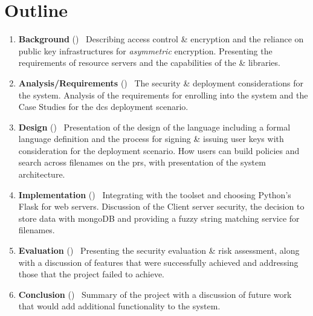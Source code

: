 \section{Outline}
\label{sec:intro_outline}

\begin{enumerate}
  \item \textbf{Background} () \textemdash\ Describing access control \& encryption and the reliance on public key infrastructures for \textit{asymmetric} encryption. Presenting the requirements of resource servers and the capabilities of the \OpenABE \& \PyOpenABE libraries.
  \item \textbf{Analysis/Requirements} () \textemdash\ The security \& deployment considerations for the \theResServer system. Analysis of the requirements for enrolling into the system and the Case Studies for the \acrshort{dcs} deployment scenario.
	\item \textbf{Design} () \textemdash\ Presentation of the design of the \thePolicyLang language including a formal language definition and the process for signing \& issuing user keys with consideration for the deployment scenario. How users can build policies and search across filenames on the \acrfull{prs}, with presentation of the \theResServer system architecture.
	\item \textbf{Implementation} () \textemdash\ Integrating with the \OpenABE toolset and choosing Python's Flask for web servers. Discussion of the Client server security, the decision to store data with mongoDB and providing a fuzzy string matching service for filenames.
	\item \textbf{Evaluation} () \textemdash\ Presenting the security evaluation \& risk assessment, along with a discussion of features that were successfully achieved and addressing those that the project failed to achieve.
	\item \textbf{Conclusion} () \textemdash\  Summary of the project with a discussion of future work that would add additional functionality to the \theResServer system.
\end{enumerate}

